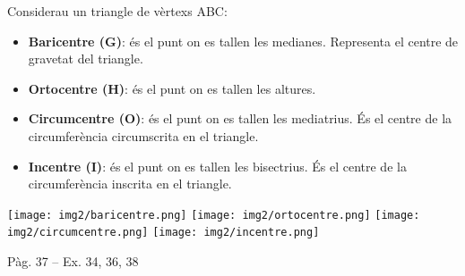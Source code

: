 \documentclass[11pt, a4paper, pdf]{article}
\renewcommand{\hot}[1][]{
	\ifthenelse{\equal{#1}{}}{$\mathbf{\bigstar}$ \underline{\textbf{LLIBRE}}: }{\myrepeat{#1}{$\mathbf{\bigstar}$}}
}
\begin{document}
\begin{theorybox}
	Considerau un triangle de vèrtexs ABC:
	
	\begin{itemize}
		\item \textbf{Baricentre (G)}: és el punt on es tallen les medianes. Representa el centre de gravetat del triangle.
		\item \textbf{Ortocentre (H)}: és el punt on es tallen les altures. 
		\item \textbf{Circumcentre (O)}:  és el punt on es tallen les mediatrius. És el centre de la circumferència circumscrita en el triangle.
		\item \textbf{Incentre (I)}: és el punt on es tallen les bisectrius. És el centre de la circumferència inscrita en el triangle.
	\end{itemize}
	\begin{center}
		
		
		\texttt{[image: img2/baricentre.png]}
		\texttt{[image: img2/ortocentre.png]}
		\texttt{[image: img2/circumcentre.png]}
		\texttt{[image: img2/incentre.png]}
		
	\end{center}
	
\end{theorybox}

\hot Pàg. 37 -- Ex. 34, 36, 38
\end{document}
